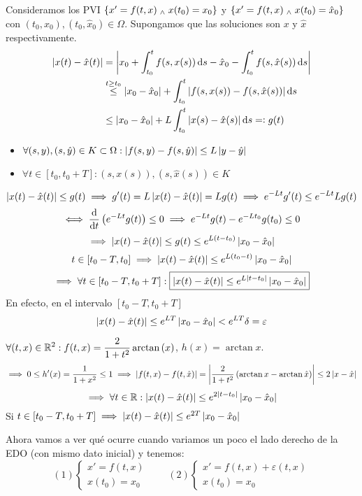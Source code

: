 Consideramos los PVI $\{x'=f(t, x) \; _{\wedge} \; x(t_0) = x_0\}$ y $\{x'=f(t, x) \; _{\wedge} \; x(t_0) = \hat{x}_0\}$ con $(t_0, x_0), (t_0, \hat{x}_0) \in \Omega$. Supongamos que las soluciones son $x$ y $\hat{x}$ respectivamente.
\[\begin{aligned}
		\abs{x(t) - \hat{x}(t)} & = \abs{x_0 + \int_{t_0}^{t} f(s, x(s)) \odif{s} - \hat{x}_0 - \int_{t_0}^{t} f(s, \hat{x}(s)) \odif{s}}        \\
		                        & \stackrel{t\geq t_0}{\leq} \abs{x_0 - \hat{x}_0} + \int_{t_0}^{t} \abs{f(s, x(s)) - f(s, \hat{x}(s))} \odif{s} \\
		                        & \leq \abs{x_0 - \hat{x}_0} + L\int_{t_0}^{t} \abs{x(s) - \hat{x}(s)} \odif{s} \eqdef g(t)
	\end{aligned}\]
\begin{itemize}
	\item $\forall (s, y), (s, \hat{y}) \in K\subset \Omega : \left|f(s, y) - f(s, \hat{y})\right| \leq L \left|y-\hat{y}\right|$
	\item $\forall t \in [t_0, t_0 + T] : (s, x(s)), (s, \hat{x}(s)) \in K$
\end{itemize}
\[\left|x(t) - \hat{x}(t)\right| \leq g(t) \implies g'(t) = L\left|x(t) - \hat{x}(t)\right| = L g(t)\implies e^{-Lt}g'(t) \leq e^{-Lt}Lg(t) \]
\[\iff \odv{}{t} \left(e^{-Lt} g(t)\right) \leq 0 \implies e^{-Lt}g(t) - e^{-Lt_0}g(t_0) \leq 0\]
\[\implies \left|x(t) - \hat{x}(t)\right| \leq g(t) \leq e^{L(t-t_0)} \left|x_0-\hat{x}_0\right|\]
\[t\in [t_0 - T, t_0] \implies \left|x(t) - \hat{x}(t)\right| \leq e^{L(t_0-t)} \left|x_0-\hat{x}_0\right|\]
\[\implies \forall t \in [t_0 - T, t_0+T] : \boxed{\left|x(t) - \hat{x}(t)\right| \leq e^{L\left|t-t_0\right|} \left|x_0-\hat{x}_0\right|}\]
En efecto, en el intervalo $[t_0-T, t_0+T]$
\[\left|x(t) - \hat{x}(t)\right| \leq e^{LT}\left|x_0-\hat{x}_0\right| < e^{LT}\delta = \varepsilon\]

\begin{ejem}
	$\displaystyle \forall (t, x) \in \mathbb{R}^2 : f(t, x) = \frac{2}{1+t^2} \arctan{(x)}$, $h(x) = \arctan{x}$.
	\[\implies 0 \leq h'(x) = \frac{1}{1+x^2} \leq 1 \implies \left|f(t, x) - f(t, \hat{x})\right| = \left|\frac{2}{1+t^2} \left(\arctan{x} - \arctan{\hat{x}}\right)\right| \leq 2\left|x-\hat{x}\right|\]
	\[\implies \forall t \in \mathbb{R} : \left|x(t) - \hat{x}(t)\right| \leq e^{2\left|t-t_0\right|}\left|x_0 - \hat{x}_0\right|\]
	Si $t\in [t_0 - T, t_0 + T] \implies \left|x(t) - \hat{x}(t)\right| \leq e^{2T}\left|x_0 - \hat{x}_0\right|$
\end{ejem}


Ahora vamos a ver qué ocurre cuando variamos un poco el lado derecho de la EDO (con mismo dato inicial) y tenemos: \[(1) \begin{cases}
		x'=f(t,x) \\ x(t_0)=x_0
	\end{cases} \qquad (2) \begin{cases}
		x'=f(t,x)+\varepsilon(t,x) \\ x(t_0)=x_0
	\end{cases}\]

